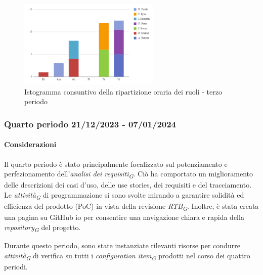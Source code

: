 \begin{figure}[H]
    \centering
    \includegraphics[width=0.6\textwidth]{../Images/consuntivoDivisioneRuoli3Periodo.png}
    \caption{Istogramma consuntivo della ripartizione oraria dei ruoli - terzo periodo}
    \label{fig:Consuntivo_ripartizione_oraria_3}
\end{figure}




\subsubsection{Quarto periodo  21/12/2023 - 07/01/2024}
\paragraph{Considerazioni}
Il quarto periodo è stato principalmente focalizzato sul potenziamento e perfezionamento dell'\textit{analisi dei requisiti}\textsubscript{\textit{G}}. Ciò ha comportato un miglioramento delle descrizioni dei casi d'uso, delle use stories, dei requisiti e del tracciamento. Le \textit{attività}\textsubscript{\textit{G}} di programmazione si sono svolte mirando a garantire solidità ed efficienza del prodotto (PoC) in vista della revisione \textit{RTB}\textsubscript{\textit{G}}. Inoltre, è stata creata una pagina su GitHub io per consentire una navigazione chiara e rapida della \textit{repository}\textsubscript{\textit{G}} del progetto.

Durante questo periodo, sono state instanziate rilevanti risorse per condurre \textit{attività}\textsubscript{\textit{G}} di verifica su tutti i \textit{configuration item}\textsubscript{\textit{G}} prodotti nel corso dei quattro periodi.

